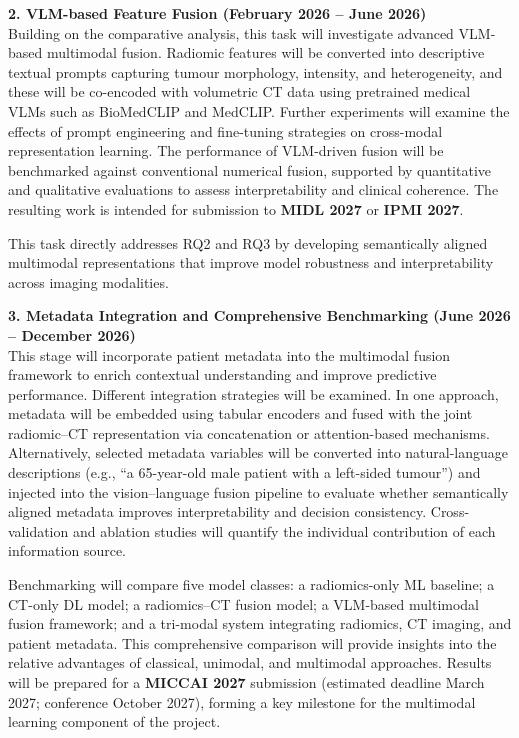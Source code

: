 \documentclass[final,british,a4paper,12pt]{phdthesis}
\begin{document}
\textbf{2. VLM-based Feature Fusion (February 2026 – June 2026)}\\
Building on the comparative analysis, this task will investigate advanced VLM-based multimodal fusion. Radiomic features will be converted into descriptive textual prompts capturing tumour morphology, intensity, and heterogeneity, and these will be co-encoded with volumetric CT data using pretrained medical VLMs such as BioMedCLIP and MedCLIP. Further experiments will examine the effects of prompt engineering and fine-tuning strategies on cross-modal representation learning. The performance of VLM-driven fusion will be benchmarked against conventional numerical fusion, supported by quantitative and qualitative evaluations to assess interpretability and clinical coherence. The resulting work is intended for submission to \textbf{MIDL 2027} or \textbf{IPMI 2027}. 

This task directly addresses RQ2 and RQ3 by developing semantically aligned multimodal representations that improve model robustness and interpretability across imaging modalities.


\textbf{3. Metadata Integration and Comprehensive Benchmarking (June 2026 – December 2026)}\\
This stage will incorporate patient metadata into the multimodal fusion framework to enrich contextual understanding and improve predictive performance. Different integration strategies will be examined. In one approach, metadata will be embedded using tabular encoders and fused with the joint radiomic–CT representation via concatenation or attention-based mechanisms. Alternatively, selected metadata variables will be converted into natural-language descriptions (e.g., “a 65-year-old male patient with a left-sided tumour”) and injected into the vision–language fusion pipeline to evaluate whether semantically aligned metadata improves interpretability and decision consistency. Cross-validation and ablation studies will quantify the individual contribution of each information source.

Benchmarking will compare five model classes: a radiomics-only ML baseline; a CT-only DL model; a radiomics–CT fusion model; a VLM-based multimodal fusion framework; and a tri-modal system integrating radiomics, CT imaging, and patient metadata. This comprehensive comparison will provide insights into the relative advantages of classical, unimodal, and multimodal approaches. Results will be prepared for a \textbf{MICCAI 2027} submission (estimated deadline March 2027; conference October 2027), forming a key milestone for the multimodal learning component of the project. 
\end{document}
